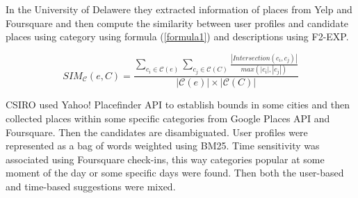 \documentclass{llncs}
\begin{document}
In the University of Delawere \cite{yang2012exploration} they extracted information of places from Yelp and Foursquare and then compute the similarity between user profiles and candidate places using category using formula (\ref{formula1}) and descriptions using F2-EXP\cite{fang2005exploration}.

\begin{equation} \label{formula1}
SIM_\mathcal{C}(e,C) = \frac{\sum_{c_{i}\in\mathcal{C}(e)}\sum_{c_{j}\in\mathcal{C}(C)}\frac{|Intersection(c_i,c_j)|}{max(|c_i|,|c_j|)}}{|\mathcal{C}(e)|\times|\mathcal{C}(C)|}
\end{equation}

CSIRO \cite{milne2012finding} used Yahoo! Placefinder API to establish bounds in some cities and then collected places within some specific categories from Google Places API and Foursquare. Then the candidates are disambiguated. User profiles were represented as a bag of words weighted using BM25. Time sensitivity was associated using Foursquare check-ins, this way categories popular at some moment of the day or some specific days were found. Then both the user-based and time-based suggestions were mixed.



\end{document}
